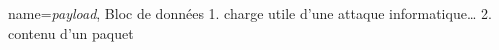 
{
  name={\textit{payload}},
}
{
Bloc de données
1. charge utile d'une attaque informatique\dots
2. contenu d'un paquet
}

